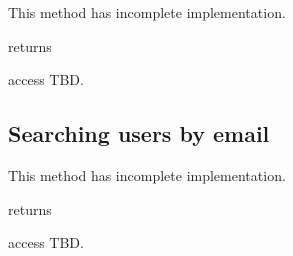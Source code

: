 This method has incomplete implementation.

\begin{apidata}{returns}
  \begin{datalist}
  \end{datalist}
\end{apidata}
\begin{apidata}{access}
  TBD.
\end{apidata}

\subsection{Searching users by email}

This method has incomplete implementation.

\begin{apidata}{returns}
  \begin{datalist}
  \end{datalist}
\end{apidata}
\begin{apidata}{access}
  TBD.
\end{apidata}


